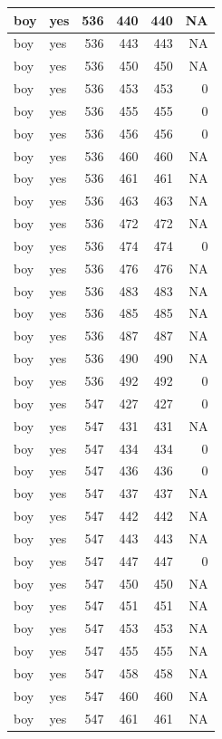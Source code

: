 \documentclass[man]{apa6}
\begin{document}
\begin{tabular}{l|l|r|r|r|r}
\hline
boy & yes & 536 & 440 & 440 & NA\\
\hline
boy & yes & 536 & 443 & 443 & NA\\
\hline
boy & yes & 536 & 450 & 450 & NA\\
\hline
boy & yes & 536 & 453 & 453 & 0\\
\hline
boy & yes & 536 & 455 & 455 & 0\\
\hline
boy & yes & 536 & 456 & 456 & 0\\
\hline
boy & yes & 536 & 460 & 460 & NA\\
\hline
boy & yes & 536 & 461 & 461 & NA\\
\hline
boy & yes & 536 & 463 & 463 & NA\\
\hline
boy & yes & 536 & 472 & 472 & NA\\
\hline
boy & yes & 536 & 474 & 474 & 0\\
\hline
boy & yes & 536 & 476 & 476 & NA\\
\hline
boy & yes & 536 & 483 & 483 & NA\\
\hline
boy & yes & 536 & 485 & 485 & NA\\
\hline
boy & yes & 536 & 487 & 487 & NA\\
\hline
boy & yes & 536 & 490 & 490 & NA\\
\hline
boy & yes & 536 & 492 & 492 & 0\\
\hline
boy & yes & 547 & 427 & 427 & 0\\
\hline
boy & yes & 547 & 431 & 431 & NA\\
\hline
boy & yes & 547 & 434 & 434 & 0\\
\hline
boy & yes & 547 & 436 & 436 & 0\\
\hline
boy & yes & 547 & 437 & 437 & NA\\
\hline
boy & yes & 547 & 442 & 442 & NA\\
\hline
boy & yes & 547 & 443 & 443 & NA\\
\hline
boy & yes & 547 & 447 & 447 & 0\\
\hline
boy & yes & 547 & 450 & 450 & NA\\
\hline
boy & yes & 547 & 451 & 451 & NA\\
\hline
boy & yes & 547 & 453 & 453 & NA\\
\hline
boy & yes & 547 & 455 & 455 & NA\\
\hline
boy & yes & 547 & 458 & 458 & NA\\
\hline
boy & yes & 547 & 460 & 460 & NA\\
\hline
boy & yes & 547 & 461 & 461 & NA\\

\end{tabular}
\end{document}
